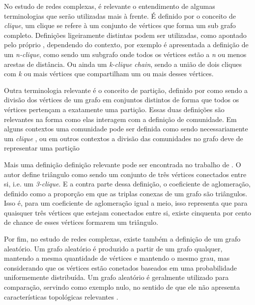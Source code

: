 \documentclass[notes.tex]{subfiles}
\begin{document}
No estudo de redes complexas, é relevante o entendimento de algumas terminologias que serão utilizadas mais à frente.
É definido por  o conceito de \emph{clique}, um clique se refere à um conjunto de vértices que forma um sub grafo completo.
Definições ligeiramente distintas podem ser utilizadas, como apontado pelo próprio , dependendo do contexto, por exemplo é apresentada a definição de um \emph{n-clique}, como sendo um subgrafo onde todos os vértices estão a \emph{n} ou menos arestas de distância.
Ou ainda um \emph{k-clique chain}, sendo a união de dois cliques com \emph{k} ou mais vértices que compartilham um ou mais desses vértices.

Outra terminologia relevante é o conceito de partição, definido por  como sendo a divisão dos vértices de um grafo em conjuntos distintos de forma que todos os vértices pertençam a exatamente uma partição.
Essas duas definições são relevantes na forma como elas interagem com a definição de comunidade.
Em alguns contextos uma comunidade pode ser definida como sendo necessariamente um \emph{clique} \cite{fortunato2010community}, ou em outros contextos a divisão das comunidades no grafo deve de representar uma partição \cite{da2020comparative, fortunato2010community}

Mais uma definição definição relevante pode ser encontrada no trabalho de .
O autor define triângulo como sendo um conjunto de três vértices conectados entre si, i.e. um \emph{3-clique}.
E a contra parte dessa definição, o coeficiente de aglomeração, definido como a proporção em que as triplas conexas de um grafo são triângulos.
Isso é, para um coeficiente de aglomeração igual a meio, isso representa que para quaisquer três vértices que estejam conectados entre si, existe cinquenta por cento de chance de esses vértices formarem um triângulo.

Por fim, no estudo de redes complexas, existe também a definição de um grafo aleatório.
Um grafo aleatório é produzido a partir de um grafo qualquer, mantendo a mesma quantidade de vértices e mantendo o mesmo grau, mas considerando que os vértices estão conetados baseados em uma probabilidade uniformemente distribuída.
Um grafo aleatório é geralmente utilizado para comparação, servindo como exemplo nulo, no sentido de que ele não apresenta características topológicas relevantes \cite{fortunato2010community}.
\end{document}
